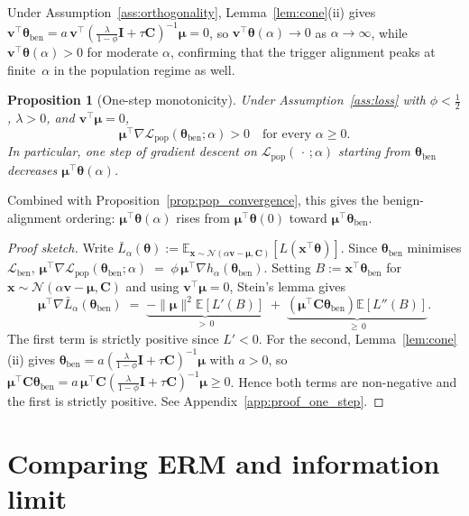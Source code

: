 \documentclass[11pt]{article}
\newcommand{\EE}{\mathbb{E}}
\newcommand{\NN}{\mathcal{N}}
\newcommand{\I}{\mathbf{I}}
\newcommand{\C}{\mathbf{C}}
\newcommand{\x}{\mathbf{x}}
\newcommand{\bv}{\mathbf{v}}
\newcommand{\bmu}{\boldsymbol{\mu}}
\newcommand{\btheta}{\boldsymbol{\theta}}
\newtheorem{proposition}[theorem]{Proposition}
\begin{document}
Under Assumption~\ref{ass:orthogonality}, Lemma~\ref{lem:cone}(ii) gives
$\bv^\top\btheta_{\mathrm{ben}} = a\,\bv^\top(\tfrac{\lambda}{1-\phi}\I+\tau\C)^{-1}\bmu = 0$,
so $\bv^\top\btheta(\alpha) \to 0$ as $\alpha \to \infty$, while
$\bv^\top\btheta(\alpha) > 0$ for moderate $\alpha$, confirming
that the trigger alignment peaks at finite~$\alpha$ in the population
regime as well.

\begin{proposition}[One-step monotonicity]
\label{prop:one_step}
Under Assumption~\ref{ass:loss} with $\phi < \tfrac{1}{2}$,
$\lambda > 0$, and $\bv^\top\bmu = 0$,
\[
\bmu^\top\nabla\mathcal{L}_{\mathrm{pop}}
(\btheta_{\mathrm{ben}};\alpha)
> 0
\quad \text{for every } \alpha \geq 0.
\]
In particular, one step of gradient descent on
$\mathcal{L}_{\mathrm{pop}}(\,\cdot\,;\alpha)$ starting from
$\btheta_{\mathrm{ben}}$ decreases $\bmu^\top\btheta(\alpha)$.
\end{proposition}

Combined with Proposition~\ref{prop:pop_convergence}, 
this gives the benign-alignment ordering: $\bmu^\top\btheta(\alpha)$ rises from $\bmu^\top\btheta(0)$ toward $\bmu^\top\btheta_{\mathrm{ben}}$.

\begin{proof}[Proof sketch]
Write $\bar{L}_\alpha(\btheta)
:= \EE_{\x\sim\NN(\alpha\bv-\bmu,\C)}[L(\x^\top\btheta)]$.
Since $\btheta_{\mathrm{ben}}$ minimises $\mathcal{L}_{\mathrm{ben}}$,
\(
\bmu^\top\nabla\mathcal{L}_{\mathrm{pop}}(\btheta_{\mathrm{ben}};\alpha)
\;=\; \phi\,\bmu^\top\nabla h_\alpha(\btheta_{\mathrm{ben}}).
\)
Setting $B := \x^\top\btheta_{\mathrm{ben}}$ for
$\x\sim\NN(\alpha\bv-\bmu,\C)$ and using $\bv^\top\bmu=0$, Stein's
lemma gives
\begin{equation}
\label{eq:stein_grad}
\bmu^\top\nabla \bar{L}_\alpha(\btheta_{\mathrm{ben}})
\;=\;
\underbrace{-\|\bmu\|^2\EE[L'(B)]}_{>\,0}
\;+\;
\underbrace{(\bmu^\top\C\btheta_{\mathrm{ben}})\EE[L''(B)]}_{\ge\,0}.
\end{equation}
The first term is strictly positive since $L'<0$.
For the second, Lemma~\ref{lem:cone}(ii) gives
$\btheta_{\mathrm{ben}} = a(\tfrac{\lambda}{1-\phi}\I+\tau\C)^{-1}\bmu$ with $a>0$,
so $\bmu^\top\C\btheta_{\mathrm{ben}} = a\,\bmu^\top\C(\tfrac{\lambda}{1-\phi}\I+\tau\C)^{-1}\bmu \geq 0$.
Hence both terms are non-negative and the first is strictly positive.
See Appendix~\ref{app:proof_one_step}.
\end{proof}

\section{Comparing ERM and information limit}
\label{sec:comparison}
\end{document}
